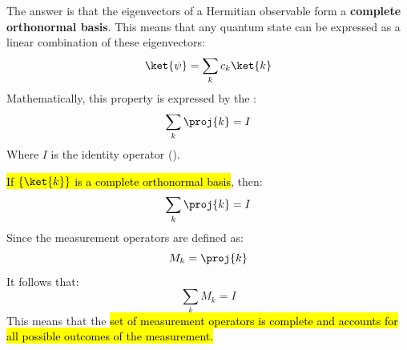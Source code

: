 \highspace
The answer is that the eigenvectors of a Hermitian observable form a \textbf{complete orthonormal basis}. This means that any quantum state can be expressed as a linear combination of these eigenvectors:
\begin{equation*}
    \ket{\psi} = \sum_k c_k \ket{k}
\end{equation*}
Mathematically, this property is expressed by the :
\begin{equation*}
    \sum_k \proj{k} = I
\end{equation*}
Where $I$ is the identity operator ().

\begin{definitionbox}
    \hl{If $\{\ket{k}\}$ is a complete orthonormal basis}, then:
    \begin{equation}\label{eq:completeness-relation}
        \sum_k \proj{k} = I
    \end{equation}
    Since the measurement operators are defined as:
    \begin{equation*}
        M_k = \proj{k}
    \end{equation*}
    It follows that:
    \begin{equation*}
        \sum_k M_k = I
    \end{equation*}
    This means that the \hl{set of measurement operators is complete and accounts for all possible outcomes of the measurement.}
\end{definitionbox}

